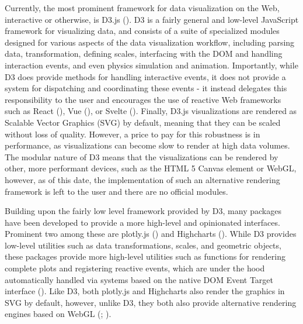 \documentclass[
]{book}
\theoremstyle{definition}
\theoremstyle{definition}
\theoremstyle{definition}
\theoremstyle{definition}
\theoremstyle{remark}
\begin{document}
Currently, the most prominent framework for data visualization on the Web, interactive or otherwise, is D3.js (). D3 is a fairly general and low-level JavaScript framework for visualizing data, and consists of a suite of specialized modules designed for various aspects of the data visualization workflow, including parsing data, transformation, defining scales, interfacing with the DOM and handling interaction events, and even physics simulation and animation. Importantly, while D3 does provide methods for handling interactive events, it does not provide a system for dispatching and coordinating these events - it instead delegates this responsibility to the user and encourages the use of reactive Web frameworks such as React (), Vue (), or Svelte (). Finally, D3.js visualizations are rendered as Scalable Vector Graphics (SVG) by default, meaning that they can be scaled without loss of quality. However, a price to pay for this robustness is in performance, as visualizations can become slow to render at high data volumes. The modular nature of D3 means that the visualizations can be rendered by other, more performant devices, such as the HTML 5 Canvas element or WebGL, however, as of this date, the implementation of such an alternative rendering framework is left to the user and there are no official modules.

Building upon the fairly low level framework provided by D3, many packages have been developed to provide a more high-level and opinionated interfaces. Prominent two among these are plotly.js () and Highcharts (). While D3 provides low-level utilities such as data transformations, scales, and geometric objects, these packages provide more high-level utilities such as functions for rendering complete plots and registering reactive events, which are under the hood automatically handled via systems based on the native DOM Event Target interface (). Like D3, both plotly.js and Highcharts also render the graphics in SVG by default, however, unlike D3, they both also provide alternative rendering engines based on WebGL (; ).
\end{document}
